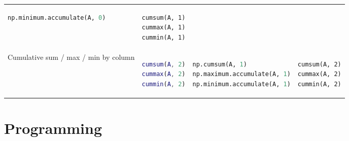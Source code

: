 \documentclass[10pt, landscape]{article}
\begin{document}
\begin{multicols}{2}
\begin{tabular}[]{@{}llll@{}}
\begin{minipage}[t]{0.24\columnwidth}
\begin{lstlisting}[language=Python]
np.minimum.accumulate(A, 0)
\end{lstlisting}
\strut
\end{minipage} & \begin{minipage}[t]{0.20\columnwidth}\raggedright\strut
\begin{lstlisting}
cumsum(A, 1)
cummax(A, 1)
cummin(A, 1)
\end{lstlisting}
\strut
\end{minipage}\tabularnewline
\begin{minipage}[t]{0.23\columnwidth}\raggedright\strut
Cumulative sum / max / min by column\strut
\end{minipage} & \begin{minipage}[t]{0.22\columnwidth}\raggedright\strut
\begin{lstlisting}[language=Matlab]
cumsum(A, 2)
cummax(A, 2)
cummin(A, 2)
\end{lstlisting}
\strut
\end{minipage} & \begin{minipage}[t]{0.24\columnwidth}\raggedright\strut
\begin{lstlisting}[language=Python]
np.cumsum(A, 1)
np.maximum.accumulate(A, 1)
np.minimum.accumulate(A, 1)
\end{lstlisting}
\strut
\end{minipage} & \begin{minipage}[t]{0.20\columnwidth}\raggedright\strut
\begin{lstlisting}
cumsum(A, 2)
cummax(A, 2)
cummin(A, 2)
\end{lstlisting}
\strut
\end{minipage}\tabularnewline
\bottomrule
\end{tabular}

\section{Programming}\label{programming}


\end{multicols}
\end{document}
